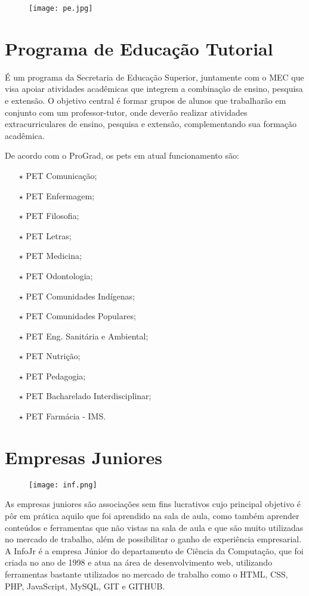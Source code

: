 \begin{wrapfigure}{R}{0.3\textwidth}
    \centering
    \texttt{[image: pe.jpg]}
\end{wrapfigure}
\section{Programa de Educação Tutorial}
    \par É um programa da Secretaria de Educação Superior, juntamente com o MEC que visa apoiar atividades acadêmicas que integrem a combinação de ensino, pesquisa e extensão. O objetivo central é formar grupos de alunos que trabalharão em conjunto com um professor-tutor, onde deverão realizar atividades extracurriculares de ensino, pesquisa e extensão, complementando sua formação acadêmica.
    \par De acordo com o ProGrad, os pets em atual funcionamento são:
    \begin{itemize}
        \item[$\star$] PET Comunicação;
        \item[$\star$] PET Enfermagem;
        \item[$\star$] PET Filosofia;
        \item[$\star$] PET Letras;
        \item[$\star$] PET Medicina;
        \item[$\star$] PET Odontologia;
        \item[$\star$] PET Comunidades Indígenas;
        \item[$\star$] PET Comunidades Populares;
        \item[$\star$] PET Eng. Sanitária e Ambiental;
        \item[$\star$] PET Nutrição;
        \item[$\star$] PET Pedagogia;
        \item[$\star$] PET Bacharelado Interdisciplinar;
        \item[$\star$] PET Farmácia - IMS.
    \end{itemize}

\section{Empresas Juniores}

    \begin{wrapfigure}{L}{0.3\textwidth}
        \centering
        \texttt{[image: inf.png]}
    \end{wrapfigure}
    \par As empresas juniores são associações sem fins lucrativos cujo principal objetivo é pôr em prática aquilo que foi aprendido na sala de aula, como também aprender conteúdos e ferramentas que não vistas na sala de aula e que são muito utilizadas no mercado de trabalho, além de possibilitar o ganho de experiência empresarial. A InfoJr é a empresa Júnior do departamento de Ciência da Computação, que foi criada no ano de 1998 e atua na área de desenvolvimento web, utilizando ferramentas bastante utilizados no mercado de trabalho como o HTML, CSS, PHP, JavaScript, MySQL, GIT e GITHUB. 
    

